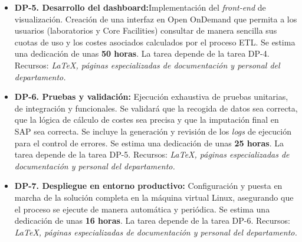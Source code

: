 \begin{itemize}
    \item \textbf{DP-5. Desarrollo del dashboard:}Implementación del \textit{front-end} de visualización. Creación de una interfaz en Open OnDemand 
    que permita a los usuarios (laboratorios y Core Facilities) consultar de manera sencilla sus cuotas de uso y los costes asociados calculados por el proceso ETL. Se estima 
    una dedicación de unas \textbf{50 horas}.
    \newline La tarea depende de la tarea DP-4.
    \newline Recursos: \textit {LaTeX, páginas especializadas de documentación y personal del departamento.}
    
    \item \textbf{DP-6. Pruebas y validación:} Ejecución exhaustiva de pruebas unitarias, de integración y funcionales. Se validará que la recogida de datos sea correcta,
    que la lógica de cálculo de costes sea precisa y que la imputación final en SAP sea correcta. Se incluye la generación y revisión de los \textit{logs} 
    de ejecución para el control de errores. Se estima una dedicación de unas \textbf{25 horas}.
    \newline La tarea depende de la tarea DP-5.
    \newline Recursos: \textit {LaTeX, páginas especializadas de documentación y personal del departamento.}
    
    \item \textbf{DP-7. Despliegue en entorno productivo:} Configuración y puesta en marcha de la solución completa en la máquina virtual Linux, asegurando que el proceso
    se ejecute de manera automática y periódica. Se estima una dedicación de unas \textbf{16 horas}.
    \newline La tarea depende de la tarea DP-6.
    \newline Recursos: \textit {LaTeX, páginas especializadas de documentación y personal del departamento.}
\end{itemize}